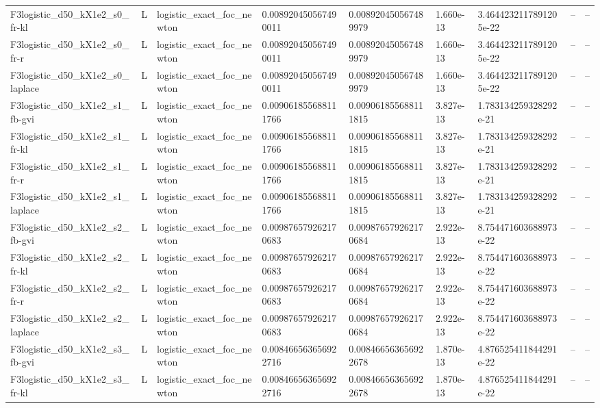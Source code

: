 \begin{tabular}{lllllllll}
F3logistic\_d50\_kX1e2\_s0\_fr-kl & L & logistic\_exact\_foc\_newton & 0.008920450567490011 & 0.008920450567489979 & 1.660e-13 & 3.4644232117891205e-22 & -- & -- \\
F3logistic\_d50\_kX1e2\_s0\_fr-r & L & logistic\_exact\_foc\_newton & 0.008920450567490011 & 0.008920450567489979 & 1.660e-13 & 3.4644232117891205e-22 & -- & -- \\
F3logistic\_d50\_kX1e2\_s0\_laplace & L & logistic\_exact\_foc\_newton & 0.008920450567490011 & 0.008920450567489979 & 1.660e-13 & 3.4644232117891205e-22 & -- & -- \\
F3logistic\_d50\_kX1e2\_s1\_fb-gvi & L & logistic\_exact\_foc\_newton & 0.009061855688111766 & 0.009061855688111815 & 3.827e-13 & 1.783134259328292e-21 & -- & -- \\
F3logistic\_d50\_kX1e2\_s1\_fr-kl & L & logistic\_exact\_foc\_newton & 0.009061855688111766 & 0.009061855688111815 & 3.827e-13 & 1.783134259328292e-21 & -- & -- \\
F3logistic\_d50\_kX1e2\_s1\_fr-r & L & logistic\_exact\_foc\_newton & 0.009061855688111766 & 0.009061855688111815 & 3.827e-13 & 1.783134259328292e-21 & -- & -- \\
F3logistic\_d50\_kX1e2\_s1\_laplace & L & logistic\_exact\_foc\_newton & 0.009061855688111766 & 0.009061855688111815 & 3.827e-13 & 1.783134259328292e-21 & -- & -- \\
F3logistic\_d50\_kX1e2\_s2\_fb-gvi & L & logistic\_exact\_foc\_newton & 0.009876579262170683 & 0.009876579262170684 & 2.922e-13 & 8.754471603688973e-22 & -- & -- \\
F3logistic\_d50\_kX1e2\_s2\_fr-kl & L & logistic\_exact\_foc\_newton & 0.009876579262170683 & 0.009876579262170684 & 2.922e-13 & 8.754471603688973e-22 & -- & -- \\
F3logistic\_d50\_kX1e2\_s2\_fr-r & L & logistic\_exact\_foc\_newton & 0.009876579262170683 & 0.009876579262170684 & 2.922e-13 & 8.754471603688973e-22 & -- & -- \\
F3logistic\_d50\_kX1e2\_s2\_laplace & L & logistic\_exact\_foc\_newton & 0.009876579262170683 & 0.009876579262170684 & 2.922e-13 & 8.754471603688973e-22 & -- & -- \\
F3logistic\_d50\_kX1e2\_s3\_fb-gvi & L & logistic\_exact\_foc\_newton & 0.008466563656922716 & 0.008466563656922678 & 1.870e-13 & 4.876525411844291e-22 & -- & -- \\
F3logistic\_d50\_kX1e2\_s3\_fr-kl & L & logistic\_exact\_foc\_newton & 0.008466563656922716 & 0.008466563656922678 & 1.870e-13 & 4.876525411844291e-22 & -- & -- \\

\end{tabular}
